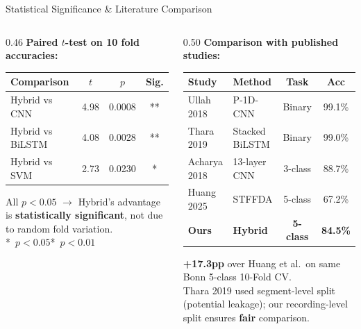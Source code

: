 \documentclass[aspectratio=169,12pt]{beamer}
\begin{document}
\begin{frame}{Statistical Significance \& Literature Comparison}
\begin{columns}[T]
\begin{column}{0.46\textwidth}
\textbf{Paired $t$-test on 10 fold accuracies:}\\[0.1cm]
\small
\begin{tabular}{lccc}
\toprule
\textbf{Comparison} & $t$ & $p$ & \textbf{Sig.}\\
\midrule
Hybrid vs CNN & 4.98 & 0.0008 & **\\
Hybrid vs BiLSTM & 4.08 & 0.0028 & **\\
Hybrid vs SVM & 2.73 & 0.0230 & *\\
\bottomrule
\end{tabular}

\vspace{0.1cm}
{\scriptsize All $p<0.05$ $\rightarrow$ Hybrid's advantage is \textbf{statistically significant}, not due to random fold variation.\\
\mbox{* $p<0.05$\quad ** $p<0.01$}}
\end{column}
\begin{column}{0.50\textwidth}
\textbf{Comparison with published studies:}\\[0.1cm]
\scriptsize
\begin{tabular}{llcc}
\toprule
\textbf{Study} & \textbf{Method} & \textbf{Task} & \textbf{Acc}\\
\midrule
Ullah 2018 & P-1D-CNN & Binary & 99.1\%\\
Thara 2019 & Stacked BiLSTM & Binary & 99.0\%\\
Acharya 2018 & 13-layer CNN & 3-class & 88.7\%\\
Huang 2025 & STFFDA & 5-class & 67.2\%\\
\midrule
\textbf{Ours} & \textbf{Hybrid} & \textbf{5-class} & \textbf{84.5\%}\\
\bottomrule
\end{tabular}

\vspace{0.1cm}
{\scriptsize \textbf{+17.3pp} over Huang et al.\ on same Bonn 5-class 10-Fold CV.\\
Thara 2019 used segment-level split (potential leakage); our recording-level split ensures \textbf{fair} comparison.}
\end{column}
\end{columns}
\end{frame}
\end{document}
